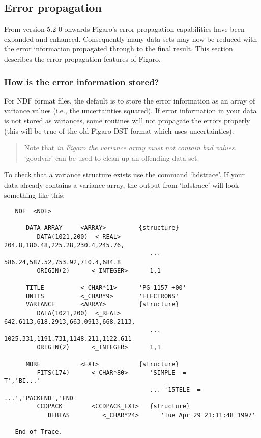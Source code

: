 
\subsection{\label{error_propagation}Error
            propagation}

From version 5.2-0 onwards Figaro's error-propagation capabilities have
been expanded and enhanced.  Consequently many data sets may now be
reduced with the error information propagated through to the final result.
This section describes the error-propagation features of Figaro.

\subsubsection{How is the error information stored?}

For NDF format files, the default is to store the error information as an
array of variance values (i.e., the uncertainties squared).  If error
information in your data is not stored as variances, some routines will
not propagate the errors properly (this will be true of the old Figaro
DST format which uses uncertainties).

\begin{quote}
Note that {\it in Figaro the variance array must not contain bad values.}
`goodvar' can be used to clean up an offending data set.
\end{quote}

To check that a variance structure exists use the command `hdstrace'. If
your data already contains a variance array, the output from `hdstrace' will
look something like this:

{\small
\begin{verbatim}
   NDF  <NDF>

      DATA_ARRAY     <ARRAY>         {structure}
         DATA(1021,200)  <_REAL>        204.8,180.48,225.28,230.4,245.76,
                                        ... 586.24,587.52,753.92,710.4,684.8
         ORIGIN(2)      <_INTEGER>      1,1

      TITLE          <_CHAR*11>      'PG 1157 +00'
      UNITS          <_CHAR*9>       'ELECTRONS'
      VARIANCE       <ARRAY>         {structure}
         DATA(1021,200)  <_REAL>        642.6113,618.2913,663.0913,668.2113,
                                        ... 1025.331,1191.731,1148.211,1122.611
         ORIGIN(2)      <_INTEGER>      1,1

      MORE           <EXT>           {structure}
         FITS(174)      <_CHAR*80>      'SIMPLE  =                    T','BI...'
                                        ... '15TELE  =       ...','PACKEND','END'
         CCDPACK        <CCDPACK_EXT>   {structure}
            DEBIAS         <_CHAR*24>      'Tue Apr 29 21:11:48 1997'

   End of Trace.
\end{verbatim}
}


